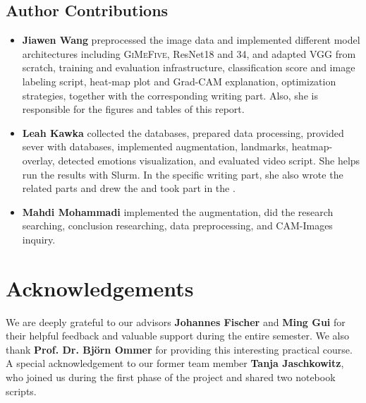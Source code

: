 \subsection*{Author Contributions}
\label{sec:author}

\begin{itemize}
  \item \textbf{Jiawen Wang} preprocessed the image data 
  and implemented different model architectures including \textsc{GiMeFive}, ResNet18 and 34, 
  and adapted VGG from scratch, 
  training and evaluation infrastructure, classification score and image labeling script, 
  heat-map plot and Grad-CAM explanation, optimization strategies, 
  together with the corresponding writing part. 
  Also, she is responsible for the figures and tables of this report.
  \item \textbf{Leah Kawka} collected the databases, prepared data processing, provided sever with databases, 
  implemented augmentation, landmarks, heatmap-overlay, detected emotions visualization, 
  and evaluated video script. 
  She helps run the results with Slurm. 
  In the specific writing part, 
  she also wrote the related parts and drew the  and took part in the .
  \item \textbf{Mahdi Mohammadi} implemented the augmentation, did the research searching, conclusion researching, data preprocessing, and CAM-Images inquiry.
\end{itemize}

\section*{Acknowledgements}

We are deeply grateful to our advisors \textbf{Johannes Fischer} and \textbf{Ming Gui} for their helpful feedback and valuable support during the entire semester. 
We also thank \textbf{Prof. Dr. Björn Ommer} for providing this interesting practical course. 
A special acknowledgement to our former team member \textbf{Tanja Jaschkowitz}, 
who joined us during the first phase of the project and shared two notebook scripts.

